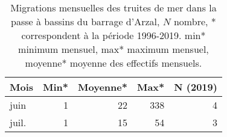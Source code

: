 \begin{table}[htbp]
\centering
\begin{tabular}{lrrrr}
  \hline
Mois & Min* & Moyenne* & Max* & N (2019) \\ 
  \hline
juin & 1 & 22 & 338 & 4 \\ 
  juil. & 1 & 15 & 54 & 3 \\ 
   \hline
\end{tabular}
\caption{Migrations mensuelles des truites de mer dans la passe à bassins du barrage d'Arzal, $N$ nombre, * correspondent à
				la période 1996-2019. min* minimum mensuel, max* maximum mensuel, moyenne* moyenne des effectifs mensuels.} 
\label{table_trm_mois}
\end{table}
